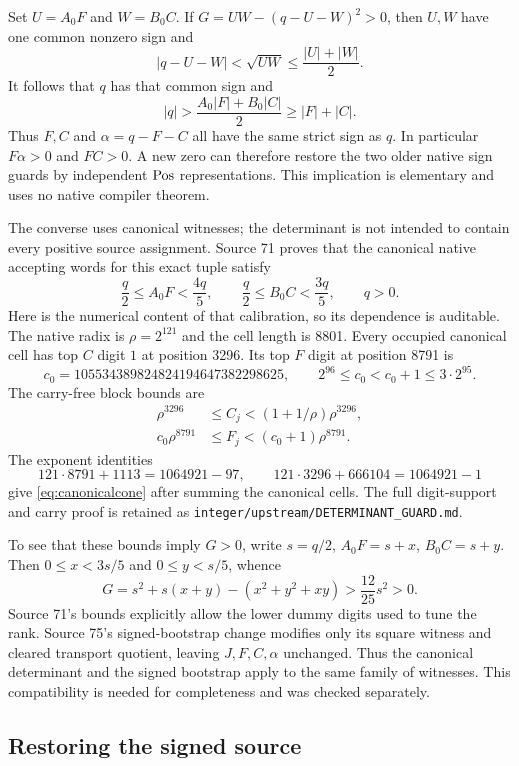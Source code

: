Set $U=A_0F$ and $W=B_0C$. If $G=UW-(q-U-W)^2>0$, then $U,W$ have
one common nonzero sign and
\[
 |q-U-W|<\sqrt{UW}\le\frac{|U|+|W|}{2}.
\]
It follows that $q$ has that common sign and
\[
 |q|>\frac{A_0|F|+B_0|C|}{2}\ge |F|+|C|.
\]
Thus $F,C$ and $\alpha=q-F-C$ all have the same strict sign as $q$.
In particular $F\alpha>0$ and $FC>0$. A new zero can therefore restore
the two older native sign guards by independent $\operatorname{Pos}$ representations.
This implication is elementary and uses no native compiler theorem.

The converse uses canonical witnesses; the determinant is not intended
to contain every positive source assignment. Source 71 proves that the
canonical native accepting words for this exact tuple satisfy
\begin{equation}
 \frac q2\le A_0F<\frac{4q}{5},\qquad
 \frac q2\le B_0C<\frac{3q}{5},\qquad q>0.
 \label{eq:canonicalcone}
\end{equation}
Here is the numerical content of that calibration, so its dependence is
auditable. The native radix is $\rho=2^{121}$ and the cell length is
8801. Every occupied canonical cell has top $C$ digit $1$ at position
3296. Its top $F$ digit at position 8791 is
\[
 c_0=105534389824824194647382298625,
 \qquad 2^{96}\le c_0<c_0+1\le3\cdot2^{95}.
\]
The carry-free block bounds are
\begin{align*}
 \rho^{3296}&\le C_j<(1+1/\rho)\rho^{3296},\\
 c_0\rho^{8791}&\le F_j<(c_0+1)\rho^{8791}.
\end{align*}
The exponent identities
\[
 121\cdot8791+1113=1064921-97,\qquad
 121\cdot3296+666104=1064921-1
\]
give \eqref{eq:canonicalcone} after summing the canonical cells.
The full digit-support and carry proof is retained as
\texttt{integer/upstream/DETERMINANT\_GUARD.md}.

To see that these bounds imply $G>0$, write $s=q/2$,
$A_0F=s+x$, $B_0C=s+y$. Then $0\le x<3s/5$ and
$0\le y<s/5$, whence
\[
 G=s^2+s(x+y)-(x^2+y^2+xy)>\frac{12}{25}s^2>0.
\]
Source 71's bounds explicitly allow the lower dummy digits used to tune
the rank. Source 75's signed-bootstrap change modifies only its square
witness and cleared transport quotient, leaving $J,F,C,\alpha$
unchanged. Thus the canonical determinant and the signed bootstrap apply
to the same family of witnesses. This compatibility is needed for
completeness and was checked separately.

\subsection{Restoring the signed source}

